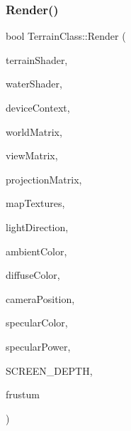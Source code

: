 \subsubsection{\texorpdfstring{Render()}{Render()}}
{\footnotesize\ttfamily bool Terrain\+Class\+::\+Render (\begin{DoxyParamCaption}\item[{\hyperlink{class_terrain_shader_class}{Terrain\+Shader\+Class} $\ast$}]{terrain\+Shader,  }\item[{\hyperlink{class_water_shader_class}{Water\+Shader\+Class} $\ast$}]{water\+Shader,  }\item[{I\+D3\+D11\+Device\+Context $\ast$}]{device\+Context,  }\item[{D3\+D\+X\+M\+A\+T\+R\+IX}]{world\+Matrix,  }\item[{D3\+D\+X\+M\+A\+T\+R\+IX}]{view\+Matrix,  }\item[{D3\+D\+X\+M\+A\+T\+R\+IX}]{projection\+Matrix,  }\item[{I\+D3\+D11\+Shader\+Resource\+View $\ast$$\ast$}]{map\+Textures,  }\item[{D3\+D\+X\+V\+E\+C\+T\+O\+R3}]{light\+Direction,  }\item[{D3\+D\+X\+V\+E\+C\+T\+O\+R4}]{ambient\+Color,  }\item[{D3\+D\+X\+V\+E\+C\+T\+O\+R4}]{diffuse\+Color,  }\item[{D3\+D\+X\+V\+E\+C\+T\+O\+R3}]{camera\+Position,  }\item[{D3\+D\+X\+V\+E\+C\+T\+O\+R4}]{specular\+Color,  }\item[{float}]{specular\+Power,  }\item[{float}]{S\+C\+R\+E\+E\+N\+\_\+\+D\+E\+P\+TH,  }\item[{\hyperlink{class_frustum_class}{Frustum\+Class} $\ast$}]{frustum }\end{DoxyParamCaption})}

